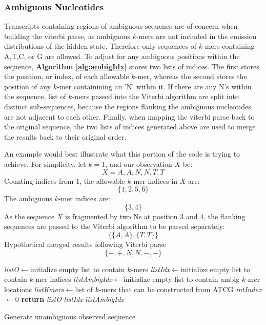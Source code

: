 \subsubsection{Ambiguous Nucleotides}
Transcripts containing regions of ambiguous sequence are of concern when building the viterbi parse, as ambiguous $k$-mers are not included in the emission distributions of the hidden state. Therefore only sequences of $k$-mers containing A,T,C, or G are allowed. To adjust for any ambiguous positions within the sequence, \textbf{Algorithm \ref{alg:ambigIdx}} stores two lists of indices. The first stores the position, or index, of each allowable $k$-mer, whereas the second stores the position of any $k$-mer containining an 'N' within it. If there are any N's within the sequence, list of $k$-mers passed into the Viterbi algorithm are split into distinct sub-sequences, because the regions flanking the ambiguous nucleotides are not adjacent to each other. Finally, when mapping the viterbi parse back to the original sequence, the two lists of indices generated above are used to merge the results back to their original order.

An example would best illustrate what this portion of the code is trying to achieve. For simplicity, let $k=1$, and our observation $X$ be: 
$$X= A,A,N,N,T,T$$
Counting indices from 1, the allowable $k$-mer indices in $X$ are:
$$\{1,2,5,6\}$$
The ambiguous $k$-mer indices are:
$$\{3,4\}$$
As the sequence $X$ is fragmented by two Ns at position 3 and 4, the flanking sequences are passed to the Viterbi algorithm to be parsed separately:
$$\{\{A,A\},\{T,T\}\}$$
Hypothetical merged results following Viterbi parse
$$\{+,+,N,N,-,-\}$$
\begin{algorithm}[h]
\DontPrintSemicolon
{}
\SetAlgoLined
{}
\emph{listO}$\leftarrow$initialize empty list to contain $k$-mers\;
\emph{listIdx}$\leftarrow$initialize empty list to contain $k$-mer indices\;
\emph{listAmbigIdx}$\leftarrow$initialize empty list to contain ambig $k$-mer locations\;
\emph{listKmers}$\leftarrow$list of $k$-mers that can be constructed from ATCG\;
\emph{intIndex}$\leftarrow$0\;
 \textbf{return} \emph{listO} \emph{listIdx} \emph{listAmbigIdx}\;
 \caption{Generate unambiguous observed sequence}
 \label{alg:ambigIdx}
\end{algorithm}

